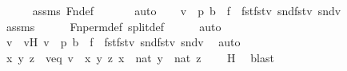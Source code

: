 \begin{isabellebody}
\ \ \ \ \isamarkupfalse%
\ assms\ Fn{\isacharunderscore}{\kern0pt}def\ \isanewline
\ \ \ \ \isamarkupfalse%
\ auto\isanewline
\ \ \isamarkupfalse%
\ {\isachardoublequoteopen}{\isasymexists}v\ {\isasymin}\ p{\isachardot}{\kern0pt}\ b\ {\isacharequal}{\kern0pt}\ {\isasymlangle}{\isasymlangle}f\ {\isacharbackquote}{\kern0pt}\ fst{\isacharparenleft}{\kern0pt}fst{\isacharparenleft}{\kern0pt}v{\isacharparenright}{\kern0pt}{\isacharparenright}{\kern0pt}{\isacharcomma}{\kern0pt}\ snd{\isacharparenleft}{\kern0pt}fst{\isacharparenleft}{\kern0pt}v{\isacharparenright}{\kern0pt}{\isacharparenright}{\kern0pt}{\isasymrangle}{\isacharcomma}{\kern0pt}\ snd{\isacharparenleft}{\kern0pt}v{\isacharparenright}{\kern0pt}{\isasymrangle}{\isachardoublequoteclose}\isanewline
\ \ \ \ \isamarkupfalse%
\ assms\isanewline
\ \ \ \ \isamarkupfalse%
\ Fn{\isacharunderscore}{\kern0pt}perm{\isacharunderscore}{\kern0pt}def\ split{\isacharunderscore}{\kern0pt}def\isanewline
\ \ \ \ \isamarkupfalse%
\ auto\isanewline
\ \ \isamarkupfalse%
\ \isamarkupfalse%
\ v\ \ vH{\isacharcolon}{\kern0pt}\ {\isachardoublequoteopen}v\ {\isasymin}\ p{\isachardoublequoteclose}\ {\isachardoublequoteopen}b\ {\isacharequal}{\kern0pt}\ {\isasymlangle}{\isasymlangle}f\ {\isacharbackquote}{\kern0pt}\ fst{\isacharparenleft}{\kern0pt}fst{\isacharparenleft}{\kern0pt}v{\isacharparenright}{\kern0pt}{\isacharparenright}{\kern0pt}{\isacharcomma}{\kern0pt}\ snd{\isacharparenleft}{\kern0pt}fst{\isacharparenleft}{\kern0pt}v{\isacharparenright}{\kern0pt}{\isacharparenright}{\kern0pt}{\isasymrangle}{\isacharcomma}{\kern0pt}\ snd{\isacharparenleft}{\kern0pt}v{\isacharparenright}{\kern0pt}{\isasymrangle}{\isachardoublequoteclose}\ \isamarkupfalse%
\ auto\isanewline
\ \ \isamarkupfalse%
\ \isamarkupfalse%
\ x\ y\ z\ \ veq{\isacharcolon}{\kern0pt}\ {\isachardoublequoteopen}v\ {\isacharequal}{\kern0pt}\ {\isacharless}{\kern0pt}{\isacharless}{\kern0pt}x{\isacharcomma}{\kern0pt}\ y{\isachargreater}{\kern0pt}{\isacharcomma}{\kern0pt}\ z{\isachargreater}{\kern0pt}{\isachardoublequoteclose}\ {\isachardoublequoteopen}x\ {\isasymin}\ nat{\isachardoublequoteclose}\ {\isachardoublequoteopen}y\ {\isasymin}\ nat{\isachardoublequoteclose}\ {\isachardoublequoteopen}z\ {\isasymin}\ {}{\isachardoublequoteclose}\ \isamarkupfalse%
\ H\ \isamarkupfalse%
\ blast\isanewline
\ \ \isamarkupfalse%

\end{isabellebody}
